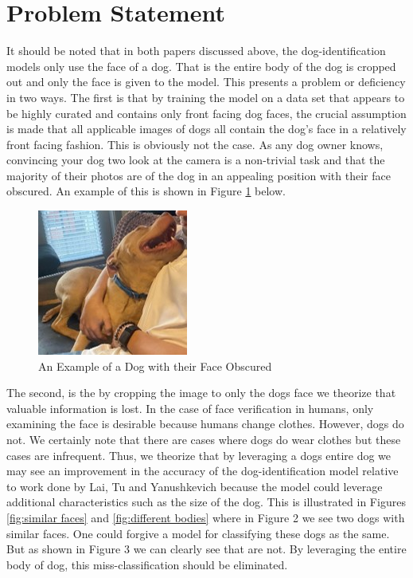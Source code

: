 \documentclass{article}
\begin{document}
\section{Problem Statement}
	It should be noted that in both papers discussed above, the dog-identification models only use the face of a dog.  That is the entire body of the dog is cropped out and only the face is given to the model.  This presents a problem or deficiency in two ways.  The first is that by training the model on a data set that appears to be highly curated and contains only front facing dog faces, the crucial assumption is made that all applicable images of dogs all contain the dog's face in a relatively front facing fashion.  This is obviously not the case.  As any dog owner knows, convincing your dog two look at the camera is a non-trivial task and that the majority of their photos are of the dog in an appealing position with their face obscured.  An example of this is shown in Figure \ref{fig:x dog no face} below.  


\begin{figure}[h]
\centering
	\includegraphics{final-report-images/nofacedog.jpg}
\caption{An Example of a Dog with their Face Obscured}
\label{fig:x dog no face}
\end{figure}
The second, is the by cropping the image to only the dogs face we theorize that valuable information is lost.  In the case of face verification in humans, only examining the face is desirable because humans change clothes.  However, dogs do not.  We certainly note that there are cases where dogs do wear clothes but these cases are infrequent.  Thus, we theorize that by leveraging a dogs entire dog we may see an improvement in the accuracy of the dog-identification model relative to work done by  Lai, Tu and Yanushkevich because the model could leverage additional characteristics such as the size of the dog.  This is illustrated in Figures \ref{fig:similar faces} and \ref{fig:different bodies} where in Figure 2 we see two dogs with similar faces.  One could forgive a model for classifying these dogs as the same.  But as shown in Figure 3 we can clearly see that are not.  By leveraging the entire body of dog, this miss-classification should be eliminated.
\end{document}
